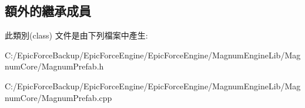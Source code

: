 \subsection*{額外的繼承成員}


此類別(class) 文件是由下列檔案中產生\+:\begin{DoxyCompactItemize}
\item 
C\+:/\+Epic\+Force\+Backup/\+Epic\+Force\+Engine/\+Epic\+Force\+Engine/\+Magnum\+Engine\+Lib/\+Magnum\+Core/Magnum\+Prefab.\+h\item 
C\+:/\+Epic\+Force\+Backup/\+Epic\+Force\+Engine/\+Epic\+Force\+Engine/\+Magnum\+Engine\+Lib/\+Magnum\+Core/Magnum\+Prefab.\+cpp\end{DoxyCompactItemize}
